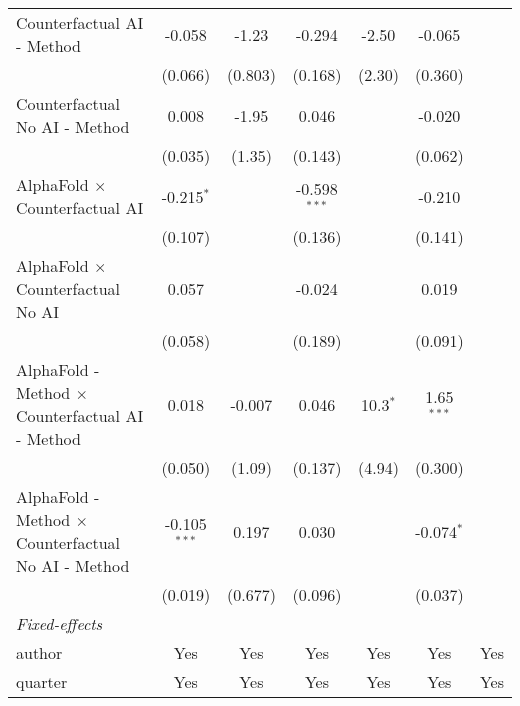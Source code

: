 \begin{tabular}{lcccccc}
   Counterfactual AI - Method                                 & -0.058         & -1.23   & -0.294         & -2.50        & -0.065       &   \\   
                                                              & (0.066)        & (0.803) & (0.168)        & (2.30)       & (0.360)      &   \\   
   Counterfactual No AI - Method                              & 0.008          & -1.95   & 0.046          &              & -0.020       &   \\   
                                                              & (0.035)        & (1.35)  & (0.143)        &              & (0.062)      &   \\   
   AlphaFold $\times$ Counterfactual AI                       & -0.215$^{*}$   &         & -0.598$^{***}$ &              & -0.210       &   \\   
                                                              & (0.107)        &         & (0.136)        &              & (0.141)      &   \\   
   AlphaFold $\times$ Counterfactual No AI                    & 0.057          &         & -0.024         &              & 0.019        &   \\   
                                                              & (0.058)        &         & (0.189)        &              & (0.091)      &   \\   
   AlphaFold - Method $\times$ Counterfactual AI - Method     & 0.018          & -0.007  & 0.046          & 10.3$^{*}$   & 1.65$^{***}$ &   \\   
                                                              & (0.050)        & (1.09)  & (0.137)        & (4.94)       & (0.300)      &   \\   
   AlphaFold - Method $\times$ Counterfactual No AI - Method  & -0.105$^{***}$ & 0.197   & 0.030          &              & -0.074$^{*}$ &   \\   
                                                              & (0.019)        & (0.677) & (0.096)        &              & (0.037)      &   \\   
   \midrule
   \emph{Fixed-effects}\\
   author                                                     & Yes            & Yes     & Yes            & Yes          & Yes          & Yes\\  
   quarter                                                    & Yes            & Yes     & Yes            & Yes          & Yes          & Yes\\  

\end{tabular}
